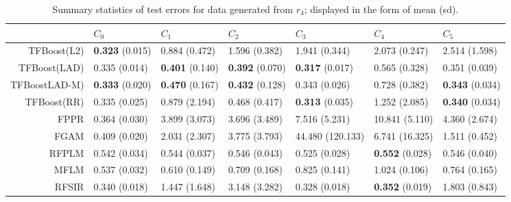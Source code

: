 \begin{table}[H]
\footnotesize
\centering
\begin{tabular}{rllllll}
  \hline
 & $C_0$ & $C_1$ & $C_2$ & $C_3$ & $C_4$ & $C_5$ \\ 
  \hline
TFBoost(L2) & \textbf{0.323} (0.015) & 0.884 (0.472) & 1.596 (0.382) & 1.941 (0.344) & 2.073 (0.247) & 2.514 (1.598) \\ 
  TFBoost(LAD) & 0.335 (0.014) & \textbf{0.401} (0.140) & \textbf{0.392} (0.070) & \textbf{0.317} (0.017) & 0.565 (0.328) & 0.351 (0.039) \\ 
  TFBoostLAD-M) & \textbf{0.333} (0.020) & \textbf{0.470} (0.167) & \textbf{0.432} (0.128) & 0.343 (0.026) & 0.728 (0.382) & \textbf{0.343} (0.034) \\ 
  TFBoost(RR) & 0.335 (0.025) & 0.879 (2.194) & 0.468 (0.417) & \textbf{0.313} (0.035) & 1.252 (2.085) & \textbf{0.340} (0.034) \\ 
  FPPR & 0.364 (0.030) & 3.899 (3.073) & 3.696 (3.489) & 7.516 (5.231) & 10.841 (5.110) & 4.360 (2.674) \\ 
  FGAM & 0.409 (0.020) & 2.031 (2.307) & 3.775 (3.793) & 44.480 (120.133) & 6.741 (16.325) & 1.511 (0.452) \\ 
  RFPLM & 0.542 (0.034) & 0.544 (0.037) & 0.546 (0.043) & 0.525 (0.028) & \textbf{0.552} (0.028) & 0.546 (0.040) \\ 
  MFLM & 0.537 (0.032) & 0.610 (0.149) & 0.709 (0.168) & 0.825 (0.141) & 1.024 (0.106) & 0.764 (0.165) \\ 
  RFSIR & 0.340 (0.018) & 1.447 (1.648) & 3.148 (3.282) & 0.328 (0.018) & \textbf{0.352} (0.019) & 1.803 (0.843) \\ 
   \hline
\end{tabular}
\caption{Summary statistics of test errors for data generated from $r_4$; displayed in the form of mean (sd).} 
\end{table}
